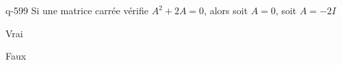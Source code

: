\begin{truefalse}{q-599}
Si une matrice carrée vérifie $A^2+2A=0$, alors soit $A=0$, soit $A=-2I$
\item Vrai
\item* Faux
\end{truefalse}

